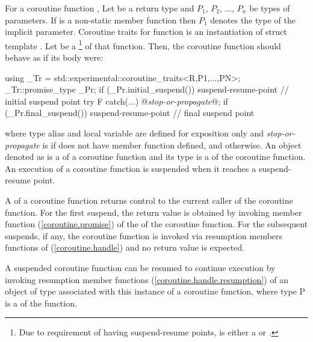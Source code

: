 \pnum
For a coroutine function , Let  be a return type and $P_1$, $P_2$, ..., $P_n$
be types of parameters. If  is a non-static member function then $P_1$ denotes the type of the implicit  parameter. 
Coroutine traits for function  is an instantiation of
struct template .
Let  be a 
\footnote{
Due to requirement of having suspend-resume points,
 is either a
 or 
.
}
of that function. Then, the coroutine function 
should behave as if its body were:
\begin{codeblock}
  {
     using _Tr = std::experimental::coroutine_traits<R,P1,...,PN>;
     _Tr::promise_type _Pr;
     if (_Pr.initial_suspend()) {
       suspend-resume-point // initial suspend point
     }
     try { F }
     catch(...) {
       @\textit{stop-or-propagate}@;
     }
     if (_Pr.final_suspend()) {
       suspend-resume-point // final suspend point
     }
  }
\end{codeblock}
where type alias  and local variable  are 
defined for
exposition only and
\textit{stop-or-propagate} is  
if  does not have  member function defined, and  otherwise. An object denoted as  is a  of
a coroutine function and its type is a 
of the coroutine function.
An execution of a coroutine function is suspended when it reaches a suspend-resume point.

\pnum 
A  of a coroutine function returns control to the current
caller of the coroutine function. For the first suspend, the return value is obtained by invoking member function 
 (\ref{coroutine.promise})
of the  of the coroutine function.
For the subsequent suspends, if any, the coroutine function
is invoked via resumption members functions of
 (\ref{coroutine.handle}) and no return value is expected.

\pnum
A suspended coroutine function can be resumed
to continue execution by invoking
resumption member functions (\ref{coroutine.handle.resumption}) of an object of  type
associated with this instance of a coroutine function, where type P
is a  of the function. 

